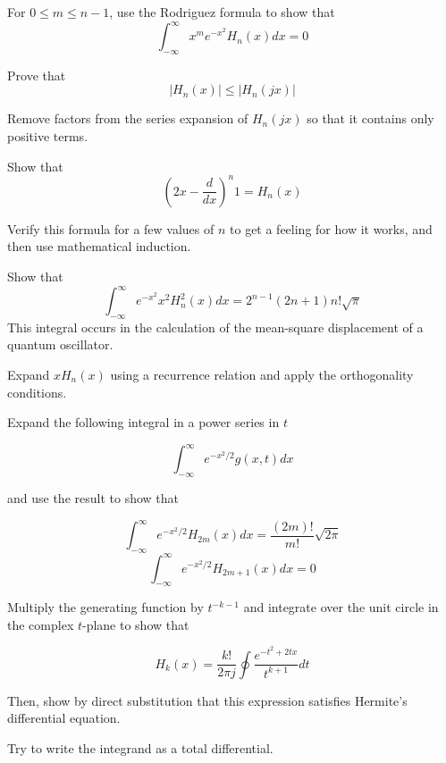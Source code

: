 \begin{exer}
For $0 \leq m \leq n-1$, use the Rodriguez formula to show that 
$$\int_{-\infty}^{\infty}x^m e^{-x^2} H_n(x) dx = 0$$
\end{exer}


\begin{exer}
Prove that 
$$ | H_n(x) | \le  | H_n(jx) | $$
\begin{hnt}Remove factors from the series expansion of $ H_n(jx) $ so that it contains only positive terms.
\end{hnt}
\end{exer}


\begin{exer}
Show that 
$$\left( 2x - \frac{d}{dx} \right)^n 1 = H_n(x)$$
\begin{hnt}Verify this formula for a few values of $n$ to get a feeling for how it works, and then use mathematical induction.
\end{hnt}
\end{exer}


\begin{exer}
Show that
$$ \int_{-\infty}^{\infty} e^{-x^2} x^2 H_n^2(x) dx = 2^{n-1} (2n + 1) n! \sqrt{\pi} $$
This integral occurs in the calculation of the mean-square displacement of a quantum oscillator.
\begin{hnt}Expand $x H_n(x)$ using a recurrence relation and apply the orthogonality conditions.
\end{hnt}  
\end{exer}


\begin{exer}
Expand the following integral in a power series in $t$

$$ \int_{-\infty}^{\infty} e^{-x^2/2} g(x,t) dx$$

and use the result to show that

$$\int_{-\infty}^{\infty} e^{-x^2/2} H_{2m}(x) dx = \frac{(2m)!}{m!} \sqrt{2\pi} $$
$$\int_{-\infty}^{\infty} e^{-x^2/2} H_{2m+1}(x) dx = 0 $$
\end{exer}



\begin{exer}
Multiply the generating function by $t^{-k-1}$ and integrate over the unit circle in the complex $t$-plane to show that

$$H_k(x) =\frac{k!}{2 \pi j} \oint \frac{e^{-t^2 +2tx}}{t^{k+1}}dt $$

Then, show by direct substitution that this expression satisfies Hermite's differential equation.

\begin{hnt}
Try to write the integrand as a total differential.\
\end{hnt}
  
\end{exer}



